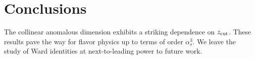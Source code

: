 \section{Conclusions}\label{sec:conclusions}

The collinear anomalous dimension exhibits a striking dependence on
$z_{\rm cut}$. These results pave the way for flavor physics up to terms
of order $\alpha_s^3$. We leave the study of Ward identities at
next-to-leading power to future work.

